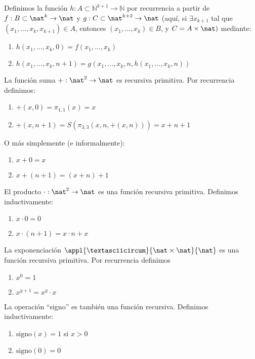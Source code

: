 \begin{defn}
	Definimos la función $h:A\subset\mathbb{N}^{k+1}\to\mathbb{N}$ por recurrencia a partir de $f:B\subset\nat^k\to \nat$ y $g:C\subset\nat^{k+2}\to\nat$ (aquí, si $\exists x_{k+1}$ tal que $(x_1, \hdots, x_k, x_{k+1})\in A$, entonces $(x_1, \hdots, x_k)\in B$, y $C=A\times\nat)$ mediante:
	\begin{enumerate}
		\item $h(x_1,\hdots, x_k,0)=f(x_1, \hdots, x_k)$
		\item $h(x_1, \hdots, x_{k}, n+1) = g(x_1, \hdots, x_k,n,h(x_1,\hdots, x_k, n))$
	\end{enumerate}
\end{defn}

\begin{example}
	La función suma $+:\nat^2\to\nat$ es  recursiva primitiva. Por recurrencia definimos:
	\begin{enumerate}
		\item $+(x,0) = \pi_{1,1}(x) = x$
		\item $+(x,n+1) =  S(\pi_{3,3}(x,n,+(x,n))) = x+n+1$
	\end{enumerate}
\end{example}

O más simplemente (e informalmente):
\begin{enumerate}
	\item $x+0 = x$
	\item $x+(n+1) = (x+n) +1$
\end{enumerate}
\begin{example}
	El producto $\cdot:\nat^2\to \nat$ es una función recursiva primitiva. Definimos inductivamente:
	\begin{enumerate}
		\item $x\cdot 0 = 0$
		\item $x\cdot(n+1) = x\cdot n + x$
	\end{enumerate}
\end{example}


\begin{example}
La exponenciación $\appl{ \textasciicircum }{\nat\times \nat}{\nat}$ es una función recursiva primitiva. Por recurrencia definimos
\begin{enumerate}
\item $x^0=1$
\item $x^{y+1} = x^y\cdot x$
\end{enumerate}
\end{example}

\begin{example}
La operación ``signo'' es también una función recursiva. Definimos inductivamente:
\begin{enumerate}
\item $\text{signo}(x)=1$ si $x>0$
\item $\text{signo}(0)=0$
\end{enumerate}
\end{example}

